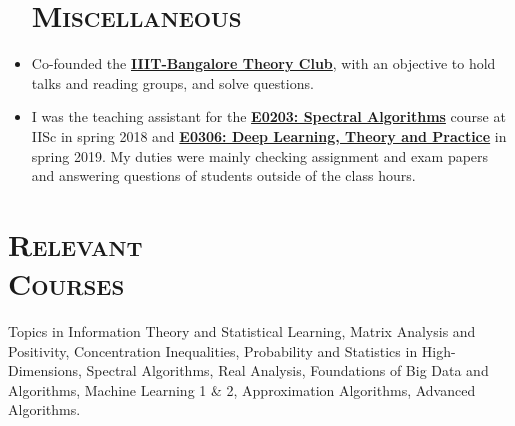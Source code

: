 \documentclass[line,margin]{res2}
\begin{document}
\begin{resume}
\begin{itemize}
\section{\textsc{Miscellaneous}}
\item Co-founded the \href{https://iiitbtheoryclub.github.io/}{\bf IIIT-Bangalore Theory Club}, with an objective to hold talks and reading groups, and solve questions.
\item I was the teaching assistant for the \href{https://www.csa.iisc.ac.in/academics/academics-courses-desc.php}{\bf E0203: Spectral Algorithms} course at IISc in spring 2018 and \href{https://dltnp.github.io/}{\bf E0306: Deep Learning, Theory and Practice} in spring 2019. My duties were mainly checking assignment and exam papers and answering questions of students outside of the class hours.
\end{itemize}

\section{\textsc{Relevant \\ Courses}} Topics in Information Theory and Statistical Learning, Matrix Analysis and Positivity, Concentration Inequalities, Probability and Statistics in High-Dimensions, Spectral Algorithms, Real Analysis, Foundations of Big Data and Algorithms, Machine Learning 1 \& 2, Approximation Algorithms, Advanced Algorithms.

\end{resume}
\end{document}
